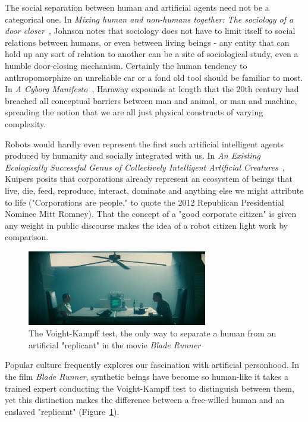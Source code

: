 \documentclass{sfuthesis}
\begin{document}
The social separation between human and artificial agents need not be a categorical one. In \textit{Mixing human and non-humans together: The sociology of a door closer}~\cite{johnson1988mixing}, Johnson notes that sociology does not have to limit itself to social relations between humans, or even between living beings - any entity that can hold up any sort of relation to another can be a site of sociological study, even a humble door-closing mechanism. Certainly the human tendency to anthropomorphize an unreliable car or a fond old tool should be familiar to most. In \textit{A Cyborg Manifesto}~\cite{haraway1991cyborg}, Haraway expounds at length that the 20th century had breached all conceptual barriers between man and animal, or man and machine, spreading the notion that we are all just physical constructs of varying complexity.

Robots would hardly even represent the first such artificial intelligent agents produced by humanity and socially integrated with us. In \textit{An Existing Ecologically Successful Genus of Collectively Intelligent Artificial Creatures}~\cite{kuipers2012existing}, Kuipers posits that corporations already represent an ecosystem of beings that live, die, feed, reproduce, interact, dominate and anything else we might attribute to life ("Corporations are people," to quote the 2012 Republican Presidential Nominee Mitt Romney). That the concept of a "good corporate citizen" is given any weight in public discourse makes the idea of a robot citizen light work by comparison.

\begin{figure}
    \centering
    \includegraphics[width=0.7\textwidth]{voight.jpg} 

    \caption{The Voight-Kampff test, the only way to separate a human from an artificial "replicant" in the movie \textit{Blade Runner}}
    \label{fig:voight}
\end{figure}

Popular culture frequently explores our fascination with artificial personhood. In the film \textit{Blade Runner}, synthetic beings have become so human-like it takes a trained expert conducting the Voight-Kampff test to distinguish between them, yet this distinction makes the difference between a free-willed human and an enslaved "replicant" (Figure~\ref{fig:voight}). 
\end{document}
